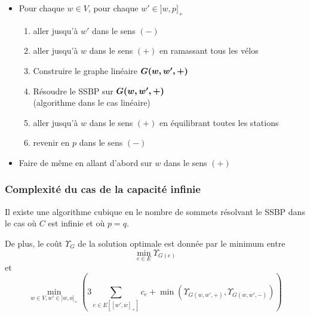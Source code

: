 \begin{frame}[label=AlgoCapaciteInfinie]
\begin{center}
\begin{minipage}[c]{\linewidth}
\begin{minipage}[c]{.2\linewidth}
\begin{overlayarea}{\textwidth}{\textheight}
        \end{overlayarea}
      \end{minipage}
      \begin{minipage}[c]{.8\linewidth}
        \begin{overlayarea}{\textwidth}{\textheight}
          \begin{itemize}
          \item<6-> Pour chaque $w \in V$, pour chaque $w' \in ]w,p]_+$
            \begin{enumerate}
            \item<7-> aller jusqu'à $w'$ dans le sens $(-)$
            \item<8-> aller jusqu'à $w$ dans le sens $(+)$ en ramassant tous les vélos
            \item<9-> Construire le graphe linéaire $\boldsymbol{G(w,w',+)}$
            \item<10-> Résoudre le SSBP sur $\boldsymbol{G(w,w',+)}$\\
            (algorithme dans le cas linéaire)
            \item<12-> aller jusqu'à $w$ dans le sens $(+)$ en équilibrant toutes les stations
            \item<13-> revenir en $p$ dans le sens $(-)$
            \end{enumerate}
          \item<14-> Faire de même en allant d'abord sur $w$ dans le sens $(+)$
          \end{itemize}
        \end{overlayarea}
      \end{minipage}
    \end{minipage}
  \end{center}
\end{frame}

\begin{frame}[label=OptimaliteCapaciteInfinie]
  \frametitle{Complexité du cas de la capacité infinie}

  \begin{thm} \label{thm: optimalité algo infini}
  Il existe une algorithme cubique en le nombre de sommets résolvant le SSBP dans le cas où $C$ est infinie et où $p=q$.

  De plus, le coût $\Upsilon_{G}$ de la solution optimale est donnée par le minimum entre
  $$
    \min_{e \in E} \Upsilon_{G(e)}
  $$
  et
  $$
    \min_{w \in V, w' \in ]w,o]_+}
    \left(
      3 \sum_{ e \in E\left[ \left[w',w\right]_+ \right] }c_e + \min \left( \Upsilon_{G(w,w',+)} , \Upsilon_{G(w,w',-)} \right)
    \right)
  $$
  \end{thm}
\end{frame}

